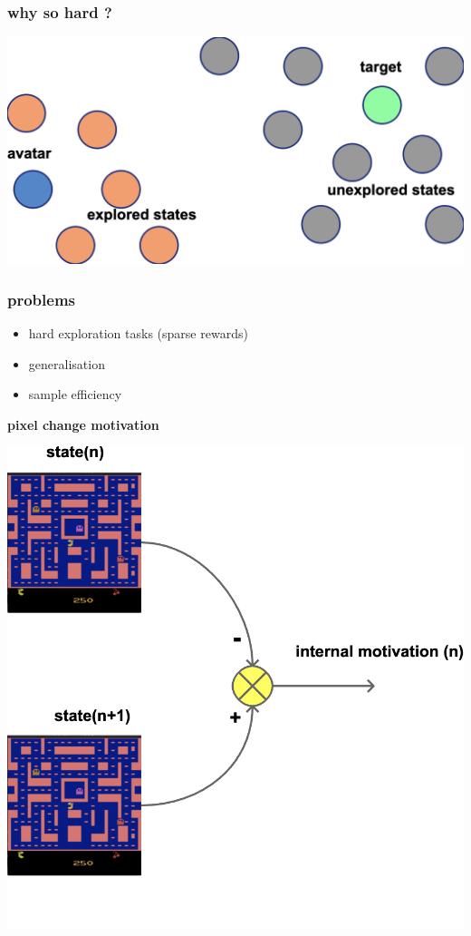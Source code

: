 \documentclass{beamer}
\begin{document}
\begin{frame}
  
  \frametitle{why so hard ?} 

  \includegraphics[scale=0.25]{../diagrams/internal_motivation/hardexploration.png}

  
\end{frame}


\begin{frame}
  \frametitle{problems} 

  \begin{itemize}
    \item hard exploration tasks (sparse rewards)
    \item generalisation
    \item sample efficiency 
  \end{itemize}

\end{frame}


  \begin{frame}{\bf pixel change motivation}

  \centering
  \includegraphics[scale=0.15]{../diagrams/internal_motivation/pixelchange.png}
  
  \end{frame}
  
\end{document}
